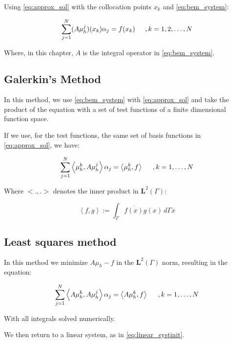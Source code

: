 Using \ref{eq:approx_sol} with the collocation points $x_{k}$ and \ref{eq:bem_system}:

\begin{equation}\label{eq:collocation}
    \sum_{j=1}^{N} (A \mu_{h}^{j})(x_{k}) \alpha_{j} = f(x_{k}) \hspace{0.2in}, k=1,2, \dots, N
\end{equation}

Where, in this chapter, $A$ is the integral operator in \autoref{eq:bem_system}.

\subsection{Galerkin's Method}

In this method, we use \ref{eq:bem_system} with \ref{eq:approx_sol} and take the product of the equation with a set of test functions of a finite dimensional function space.

If we use, for the test functions, the same set of basis functions in \ref{eq:approx_sol}, we have:

\begin{equation}\label{eq:galerkin}
    \sum_{j=1}^{N} \left<\mu_{h}^{k} ,A\mu_{h}^{j}\right> \alpha_{j} = \left< \mu_{h}^{k},f\right> \hspace{0.2in}, k = 1, \dots, N
\end{equation}

Where $<.,.>$ denotes the inner product in $\mathbf{L}^{2}(\Gamma) $:

\begin{equation}
    \left<f,g\right>:= \int_{\Gamma} \overline{f(x)} g(x) \,d \Gamma x
\end{equation}


\subsection{Least squares method}

In this method we  minimize $A\mu_{h} - f$ in the $\mathbf{L}^{2}(\Gamma)$ norm, resulting in the equation:

\begin{equation}
    \sum_{j=1}^{N} \left< A \mu_{h}^{k},A \mu_{h}^{j} \right>\alpha_{j} = \left<A \mu_{h}^{k},f \right> \hspace{0.2in}, k=1, \dots, N
\end{equation}

With all integrals solved numerically.


We then return to a linear system, as in \ref{eq:linear_systinit}.


